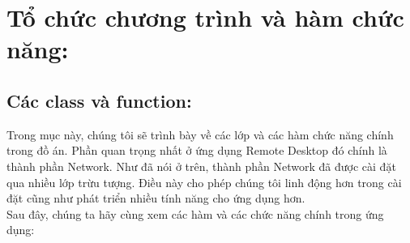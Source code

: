 \section{Tổ chức chương trình và hàm chức năng: }



\subsection{Các class và function: }
Trong mục này, chúng tôi sẽ trình bày về các lớp và các hàm chức năng chính trong đồ án. Phần quan trọng nhất ở ứng dụng Remote Desktop đó chính là thành phần Network. Như đã nói ở trên, thành phần Network đã được cài đặt qua nhiều lớp trừu tượng. Điều này cho phép chúng tôi linh động hơn trong cài đặt cũng như phát triển nhiều tính năng cho ứng dụng hơn. \\

Sau đây, chúng ta hãy cùng xem các hàm và các chức năng chính trong ứng dụng:
